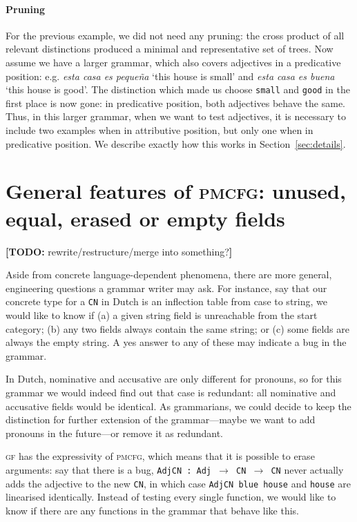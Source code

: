 \documentclass[11pt]{article}
\def\t#1{\texttt{#1}}
\def\gf{\textsc{gf}}
\def\pmcfg{\textsc{pmcfg}}
\newcommand{\todo}[1]{{\color{cyan}\textbf{[TODO: }#1\textbf{]}}}
\begin{document}
\paragraph{Pruning} For the previous example, we did not need any pruning: the cross
product of all relevant distinctions produced a minimal and
representative set of trees. Now assume we have a larger grammar,
which also covers adjectives in a predicative position:
e.g. \emph{esta casa es peque\~{n}a} `this house is small' and
\emph{esta casa es buena} `this house is good'. The distinction which
made us choose \t{small} and \t{good} in the first place is now gone:
in predicative position, both adjectives behave the same. Thus, in
this larger grammar, when we want to test adjectives, it is necessary
to include two examples when in attributive position, but only one
when in predicative position. We describe exactly how this works in
Section~\ref{sec:details}. 

\section{General features of \pmcfg: unused, equal,
  erased or empty fields}

\todo{rewrite/restructure/merge into something?}

Aside from concrete language-dependent phenomena, there are more
general, engineering questions a grammar writer may ask. For instance, say that our
concrete type for a \t{CN} in Dutch is an inflection table from case
to string, we would like to know if (a) a given string field is unreachable from the start category; (b) any two fields always contain the same string; or (c) some fields
are always the empty string. A yes answer to any of these may indicate a bug in the grammar.

In Dutch, nominative and accusative are only different for
pronouns, so for this grammar we would indeed find out that case is
redundant: all nominative and accusative fields would be
identical. As grammarians, we could decide to keep the distinction for
further extension of the grammar---maybe we want to add pronouns in
the future---or remove it as redundant.

\gf{} has the expressivity of \pmcfg{}, which means that it is
possible to erase arguments: say that there is a bug, \t{AdjCN : Adj
  $\rightarrow$ CN  $\rightarrow$ CN} never actually adds the
adjective to the new \t{CN}, in which case \t{AdjCN blue house} and
\t{house} are linearised identically. Instead of testing every single
function, we would like to know if there are any functions in the
grammar that behave like this.
\end{document}
